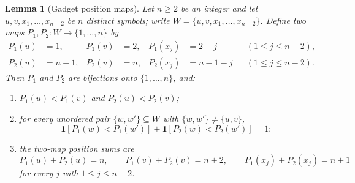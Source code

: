 \documentclass[11pt]{article}
\newcommand{\ind}{\mathbf{1}}
\newtheorem{alemma}{Lemma}[section] %
\begin{document}
\begin{alemma}[Gadget position maps]\label{alem:gadget}
Let $n\ge 2$ be an integer and let $u,v,x_1,\ldots,x_{n-2}$ be $n$ distinct symbols; write $W=\{u,v,x_1,\ldots,x_{n-2}\}$.  Define two maps $P_1,P_2\colon W\to\{1,\ldots,n\}$ by
\begin{equation}\label{eq:abstract-positions}
\begin{aligned}
  P_1(u)&=1, & P_1(v)&=2, & P_1(x_j)&=2+j &&(1\le j\le n-2),\\
  P_2(u)&=n-1, & P_2(v)&=n, & P_2(x_j)&=n-1-j &&(1\le j\le n-2).
\end{aligned}
\end{equation}
Then $P_1$ and $P_2$ are bijections onto $\{1,\ldots,n\}$, and:
\begin{enumerate}[label=(G\arabic*)]
\item\label{g:own} $P_1(u)<P_1(v)$ and $P_2(u)<P_2(v)$;
\item\label{g:split} for every unordered pair $\{w,w'\}\subseteq W$ with $\{w,w'\}\ne\{u,v\}$,
\begin{equation}
  \ind[P_1(w)<P_1(w')]+\ind[P_2(w)<P_2(w')]=1;
\end{equation}
\item\label{g:ranksum} the two-map position sums are
\begin{equation}
  P_1(u)+P_2(u)=n,\qquad
  P_1(v)+P_2(v)=n+2,\qquad
  P_1(x_j)+P_2(x_j)=n+1
\end{equation}
for every $j$ with $1\le j\le n-2$.
\end{enumerate}
\end{alemma}
\end{document}
